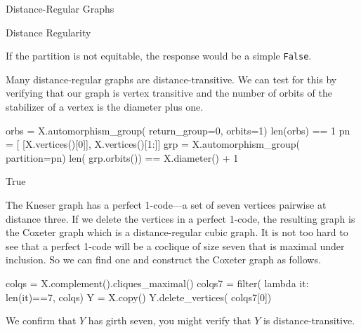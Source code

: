 \begin{chap}{Distance-Regular Graphs}
\begin{sect}{Distance Regularity}
\begin{sagecode}
\begin{sageoutput}
[1 0 3 0]                                                                                                             
[0 1 0 3]                                                                                                             
[0 0 2 2]                                                                                                             \end{sageoutput}
\end{sagecode}
%
\begin{para}
If the partition is not equitable, the response would be a simple
\verb|False|.
\end{para}
%
\begin{para}
Many distance-regular graphs are distance-transitive. We can test for this
by verifying that our graph is vertex transitive and the number of
orbits of the stabilizer of a vertex is the diameter plus one.
\end{para}
%
\begin{sagecode}
\begin{sageinput}
orbs = X.automorphism_group( return_group=0, orbits=1)
len(orbs) == 1 
pn = [ [X.vertices()[0]], X.vertices()[1:]]
grp = X.automorphism_group( partition=pn)
len( grp.orbits()) == X.diameter() + 1
\end{sageinput}
\begin{sageoutput}
True
\end{sageoutput}
\end{sagecode}
%
\begin{para}
The Kneser graph has a perfect 1-code---a set of seven vertices pairwise at distance
three. If we delete the vertices in a perfect 1-code, the resulting graph
is the Coxeter graph which is a distance-regular cubic graph.
It is not too hard to see that a perfect 1-code will be a coclique of size seven
that is maximal under inclusion. So we can find one and construct the
Coxeter graph as follows.
\end{para}
%
\begin{sagecode}
\begin{sageinput}
colqs = X.complement().cliques_maximal()
colqs7 = filter( lambda it: len(it)==7, colqs)
Y = X.copy()
Y.delete_vertices( colqs7[0])
\end{sageinput}
\end{sagecode}
%
\begin{para}
We confirm that $Y$ has girth seven, you might verify that $Y$ is distance-transitive.
\end{para}
%
\begin{sagecode}

\end{sagecode}
\end{sect}
\end{chap}
